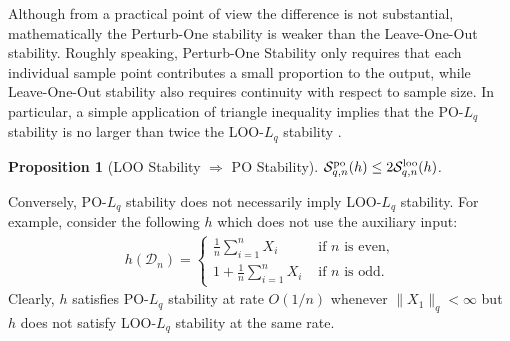 \documentclass[11pt]{article}
\theoremstyle{plain}
\newtheorem{proposition}[theorem]{Proposition}
\newcommand{\cv}{{\mathrm{cv}}}
\newcommand{\tr}{{\mathrm{tr}}}
\newcommand{\D}{{\mathcal{D}}}
\renewcommand{\S}{{\mathcal{S}}}
\newcommand{\X}{{\mathcal{X}}}
\begin{document}
Although from a practical point of view the difference is not substantial, mathematically the Perturb-One stability is weaker than the Leave-One-Out stability. Roughly speaking, Perturb-One Stability only requires that each individual sample point contributes a small proportion to the output, while Leave-One-Out stability also requires continuity with respect to sample size.  In particular, a simple application of triangle inequality implies that the PO-$L_q$ stability is no larger than twice the LOO-$L_q$ stability .
\begin{proposition}[LOO Stability $\Rightarrow$ PO Stability]\label{pro:2.2-loo-imply-po}
     $\S_{q,n}^{\rm po}(h)\le 2\S_{q,n}^{\rm loo}(h)$.
\end{proposition}
Conversely, PO-$L_q$ stability does not necessarily imply LOO-$L_q$ stability.  For  example, consider the following $h$ which does not use the auxiliary input: 
\begin{align*}
    h(\D_n) = \left\{\begin{array}{cc}
        \frac{1}{n}\sum_{i=1}^n X_i & \text{ if $n$ is even,} \\
        1+ \frac{1}{n}\sum_{i=1}^n X_i & \text{ if $n$ is odd.} 
    \end{array}\right.
\end{align*}
Clearly, $h$ satisfies PO-$L_q$ stability at rate $O(1/n)$ whenever $\|X_1\|_{q}<\infty$ but $h$ does not satisfy LOO-$L_q$ stability at the same rate.  




\end{document}
